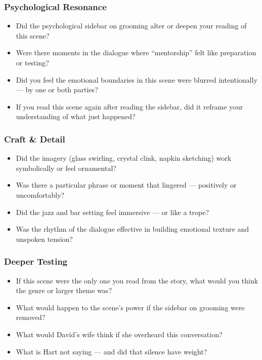 \subsubsection*{Psychological Resonance}

\begin{itemize}
\item Did the psychological sidebar on grooming alter or deepen your reading of this scene?
\item Were there moments in the dialogue where “mentorship” felt like preparation or testing?
\item Did you feel the emotional boundaries in this scene were blurred intentionally — by one or both parties?
\item If you read this scene again after reading the sidebar, did it reframe your understanding of what just happened?
\end{itemize}

\subsubsection*{Craft \& Detail}

\begin{itemize}
\item Did the imagery (glass swirling, crystal clink, napkin sketching) work symbolically or feel ornamental?
\item Was there a particular phrase or moment that lingered — positively or uncomfortably?
\item Did the jazz and bar setting feel immersive — or like a trope?
\item Was the rhythm of the dialogue effective in building emotional texture and unspoken tension?
\end{itemize}

\subsubsection*{Deeper Testing}

\begin{itemize}
\item If this scene were the only one you read from the story, what would you think the genre or larger theme was?
\item What would happen to the scene’s power if the sidebar on grooming were removed?
\item What would David’s wife think if she overheard this conversation?
\item What is Hart not saying — and did that silence have weight?
\end{itemize}


